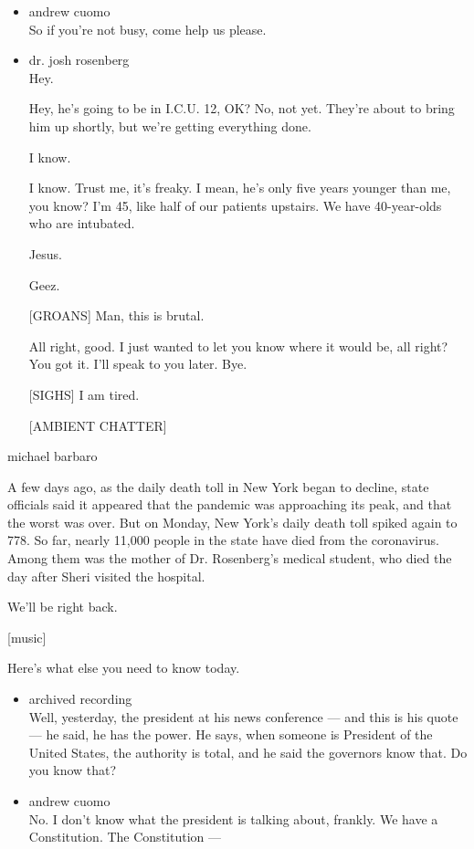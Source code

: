\begin{itemize}
\item
  andrew cuomo\\
  So if you're not busy, come help us please.
\item
  dr. josh rosenberg\\
  Hey.

  Hey, he's going to be in I.C.U. 12, OK? No, not yet. They're about to
  bring him up shortly, but we're getting everything done.

  I know.

  I know. Trust me, it's freaky. I mean, he's only five years younger
  than me, you know? I'm 45, like half of our patients upstairs. We have
  40-year-olds who are intubated.

  Jesus.

  Geez.

  {[}GROANS{]} Man, this is brutal.

  All right, good. I just wanted to let you know where it would be, all
  right? You got it. I'll speak to you later. Bye.

  {[}SIGHS{]} I am tired.

  {[}AMBIENT CHATTER{]}
\end{itemize}

michael barbaro

A few days ago, as the daily death toll in New York began to decline,
state officials said it appeared that the pandemic was approaching its
peak, and that the worst was over. But on Monday, New York's daily death
toll spiked again to 778. So far, nearly 11,000 people in the state have
died from the coronavirus. Among them was the mother of Dr. Rosenberg's
medical student, who died the day after Sheri visited the hospital.

We'll be right back.

{[}music{]}

Here's what else you need to know today.

\begin{itemize}
\item
  archived recording\\
  Well, yesterday, the president at his news conference --- and this is
  his quote --- he said, he has the power. He says, when someone is
  President of the United States, the authority is total, and he said
  the governors know that. Do you know that?
\item
  andrew cuomo\\
  No. I don't know what the president is talking about, frankly. We have
  a Constitution. The Constitution ---
\end{itemize}

